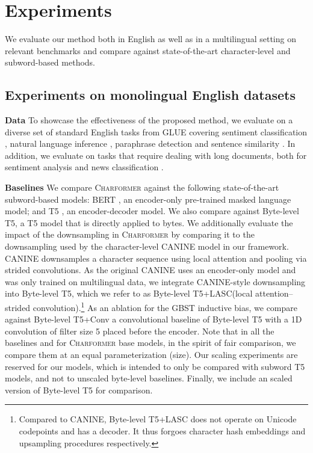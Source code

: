 \documentclass{article} \usepackage{iclr2022_conference,times}
\newcommand{\charformer}{\textsc{Charformer}\xspace}
\newcommand{\byte}{Byte-level T5\xspace}
\newcommand{\canine}{Byte-level T5+LASC\xspace}
\newcommand{\convbase}{Byte-level T5+Conv\xspace}
\begin{document}
\section{Experiments} \label{sec:experiments}

We evaluate our method both in English as well as in a multilingual setting on relevant benchmarks and compare against state-of-the-art character-level and subword-based methods.



\subsection{Experiments on monolingual English datasets} \label{sec:english-experiments}


\noindent \textbf{Data}  To showcase the effectiveness of the proposed method, we evaluate on a diverse set of standard English tasks from GLUE covering sentiment classification \citep[SST-2;][]{socher-etal-2013-recursive}, natural language inference \citep[MNLI, QNLI;][]{williams-etal-2018-broad,rajpurkar-etal-2016-squad}, paraphrase detection \citep[MRPC, QQP]{dolan2005automatically} and sentence similarity \citep{cer2017semeval}.  In addition, we evaluate on tasks that require dealing with long documents, both for sentiment analysis \citep[IMDb;][]{maas2011learning} and news classification \citep[AGNews;][]{Zhang2015character}.


\noindent \textbf{Baselines}  We compare \charformer against the following state-of-the-art subword-based models: BERT \citep{Devlin2019bert}, an encoder-only pre-trained masked language model; and T5 \citep{Raffel2020t5}, an encoder-decoder model. We also compare against \byte \citep{Xue2021byt5}, a T5 model that is directly applied to bytes. We additionally evaluate the impact of the downsampling in \charformer by comparing it to the downsampling used by the character-level CANINE \citep{clark2021canine} model in our framework. CANINE downsamples a character sequence using local attention and pooling via strided convolutions. As the original CANINE uses an encoder-only model and was only trained on multilingual data, we integrate CANINE-style downsampling into \byte, which we refer to as \canine (local attention–strided convolution).\footnote{Compared to CANINE, \canine does not operate on Unicode codepoints and has a decoder. It thus forgoes character hash embeddings and upsampling procedures respectively.} As an ablation for the GBST inductive bias, we compare against \convbase a convolutional baseline of Byte-level T5 with a 1D convolution of filter size 5 placed before the encoder. Note that in all the baselines and for \charformer base models, in the spirit of fair comparison, we compare them at an equal parameterization (size). Our scaling experiments are reserved for our  models, which is intended to only be compared with subword T5 models, and not to unscaled byte-level baselines. Finally, we include an  scaled version of \byte for comparison.
\end{document}
